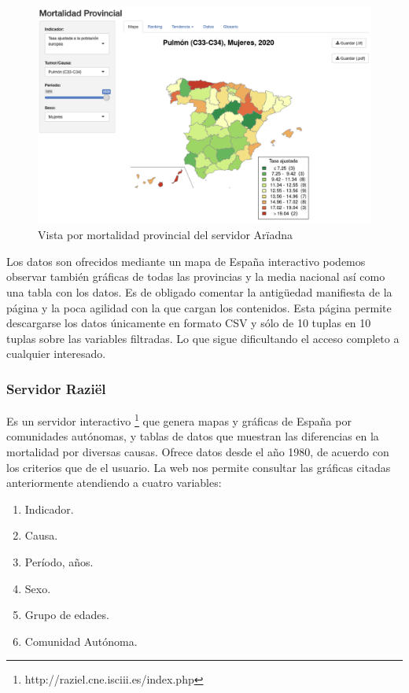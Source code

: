 \begin{figure}[]
	\centering
	\includegraphics[scale=0.5]{doc/logos/imgs/ariadna2.png}
	\caption{ Vista por mortalidad provincial del servidor Arïadna }
    \label{fig:worst_f_value}
\end{figure}
\FloatBarrier
Los datos son ofrecidos mediante un mapa de España interactivo podemos observar también gráficas de todas las provincias y la media nacional así como una tabla con los datos. Es de obligado comentar la antigüedad manifiesta de la página y la poca agilidad con la que cargan los contenidos.
Esta página permite descargarse los datos únicamente en formato CSV y sólo de 10 tuplas en 10 tuplas sobre las  variables filtradas. Lo que sigue dificultando el acceso completo a cualquier interesado.

\subsubsection{Servidor Raziël}
Es un servidor interactivo \footnote{http://raziel.cne.isciii.es/index.php} que genera mapas y gráficas de España por comunidades autónomas, y tablas de datos que muestran las diferencias en la mortalidad por diversas causas. Ofrece datos desde el año 1980, de acuerdo con los criterios que de el usuario.
La web nos permite consultar las gráficas citadas anteriormente atendiendo a cuatro variables:
\begin{enumerate}
    \item Indicador.
    \item Causa.
    \item Período, años.
    \item Sexo.
    \item Grupo de edades.
    \item Comunidad Autónoma.
\end{enumerate}

